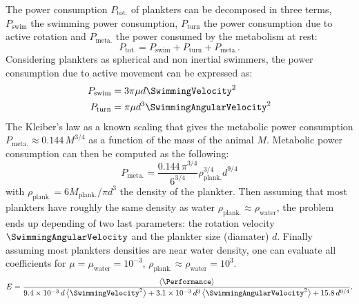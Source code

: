 The power consumption $P_{\mathrm{tot.}}$ of plankters can be decomposed in three terms, $P_{\mathrm{swim}}$ the swimming power consumption, $P_{\mathrm{turn}}$ the power consumption due to active rotation and $P_{\mathrm{meta.}}$ the power consumed by the metabolism at rest:
\begin{equation}
	P_{\mathrm{tot.}} = P_{\mathrm{swim}} + P_{\mathrm{turn}} + P_{\mathrm{meta.}}.
\end{equation}
Considering plankters as spherical and non inertial swimmers, the power consumption due to active movement can be expressed as:
\begin{subequations}
	\begin{align}
		P_{\mathrm{swim}} &= 3 \pi \mu d \SwimmingVelocity^2\\
		P_{\mathrm{turn}} &= \pi \mu d^3 \SwimmingAngularVelocity^2
	\end{align}
\end{subequations}
The Kleiber's law as a known scaling that gives the metabolic power consumption $P_{\mathrm{meta.}} \approx 0.144 \, M^{3/4}$ \citep{gillooly2001effects} as a function of the mass of the animal $M$.
Metabolic power consumption can then be computed as the following:
\begin{equation}\label{eq:kleiber}
	P_{\mathrm{meta.}} = \frac{0.144 \, \pi^{3/4}}{6^{3/4}} \rho_{\mathrm{plank.}}^{3/4} d^{9/4}
\end{equation}
with $\rho_{\mathrm{plank.}} = 6 M_{\mathrm{plank.}} / \pi d^3$ the density of the plankter.
Then assuming that most plankters have roughly the same density as water $\rho_{\mathrm{plank.}} \approx \rho_{\mathrm{water}}$, the problem ends up depending of two last parameters: the rotation velocity $\SwimmingAngularVelocity$ and the plankter size (diamater) $d$.
Finally assuming most plankters densities are near water density, one can evaluate all coefficients for $\mu = \mu_{\mathrm{water}} = 10^{-3}$, $\rho_{\mathrm{plank.}} \approx \rho_{\mathrm{water}} = 10^{3}$.
\begin{equation}
	E = \frac{\left\langle \Performance \right\rangle}{9.4 \times 10^{-3} \, d \left\langle \SwimmingVelocity^2 \right\rangle + 3.1 \times 10^{-3} \, d^3 \left\langle \SwimmingAngularVelocity^2 \right\rangle + 15.8 \, d^{9/4}}.
\end{equation}


